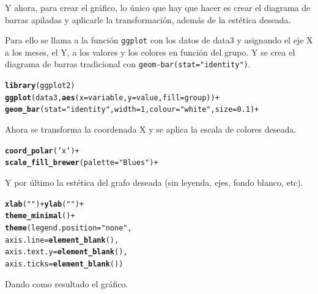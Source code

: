 \documentclass{article}\usepackage[]{graphicx}\usepackage[]{color}
\makeatletter
\newcommand{\hlstr}[1]{\textcolor[rgb]{0.192,0.494,0.8}{#1}}%
\newcommand{\hlopt}[1]{\textcolor[rgb]{0,0,0}{#1}}%
\newcommand{\hlstd}[1]{\textcolor[rgb]{0.345,0.345,0.345}{#1}}%
\newcommand{\hlkwc}[1]{\textcolor[rgb]{0.333,0.667,0.333}{#1}}%
\newcommand{\hlkwd}[1]{\textcolor[rgb]{0.737,0.353,0.396}{\textbf{#1}}}%
\newenvironment{kframe}{%
 \def\at@end@of@kframe{}%
 \ifinner\ifhmode%
  \def\at@end@of@kframe{\end{minipage}}%
  \begin{minipage}{\columnwidth}%
 \fi\fi%
 \def\FrameCommand##1{\hskip\@totalleftmargin \hskip-\fboxsep
 \colorbox{shadecolor}{##1}\hskip-\fboxsep
     \hskip-\linewidth \hskip-\@totalleftmargin \hskip\columnwidth}%
 \MakeFramed {\advance\hsize-\width
   \@totalleftmargin\z@ \linewidth\hsize
   \@setminipage}}%
 {\par\unskip\endMakeFramed%
 \at@end@of@kframe}
\newenvironment{knitrout}{}{} %
\makeatother
\begin{document}
Y ahora, para crear el gr\'afico, lo \'unico que hay que hacer es crear el diagrama de barras apiladas y aplicarle la transformaci\'on, adem\'as de la est\'etica deseada.

Para ello se llama a la funci\'on \texttt{ggplot} con los datos de data3 y asignando el eje X a los meses, el Y, a los valores y los colores en funci\'on del grupo. Y se crea el diagrama de barras tradicional con \texttt{geom-bar(stat="identity")}.
\begin{knitrout}
\color{fgcolor}\begin{kframe}
\begin{alltt}
\hlkwd{library}(ggplot2)
\hlkwd{ggplot}(data3,\hlkwd{aes}(x=variable,y=value,fill=group))+
  \hlkwd{geom_bar}(stat=\hlstr{"identity"},width=1,colour=\hlstr{"white"},size=0.1)+
\end{alltt}
\end{kframe}
\end{knitrout}
Ahora se transforma la coordenada X y se aplica la escala de colores deseada.
\begin{knitrout}
\color{fgcolor}\begin{kframe}
\begin{alltt}
  \hlkwd{coord_polar}(\hlstr{'x'})+
  \hlkwd{scale_fill_brewer}(palette=\hlstr{"Blues"})+
\end{alltt}
\end{kframe}
\end{knitrout}
Y por \'ultimo la est\'etica del grafo deseada (sin leyenda, ejes, fondo blanco, etc).
\begin{knitrout}
\color{fgcolor}\begin{kframe}
\begin{alltt}
  \hlkwd{xlab}\hlstd{(}\hlstr{""}\hlstd{)}\hlopt{+}\hlkwd{ylab}\hlstd{(}\hlstr{""}\hlstd{)} \hlopt{+}
  \hlkwd{theme_minimal}\hlstd{()} \hlopt{+}
  \hlkwd{theme}\hlstd{(}\hlkwc{legend.position} \hlstd{=} \hlstr{"none"}\hlstd{,}
        \hlkwc{axis.line} \hlstd{=} \hlkwd{element_blank}\hlstd{(),}
        \hlkwc{axis.text.y} \hlstd{=} \hlkwd{element_blank}\hlstd{(),}
        \hlkwc{axis.ticks} \hlstd{=} \hlkwd{element_blank}\hlstd{())}
\end{alltt}
\end{kframe}
\end{knitrout}
Dando como resultado el gr\'afico.
\end{document}
